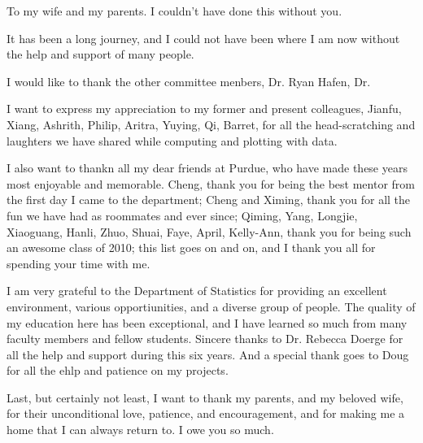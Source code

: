 %
%
%
%
%

\begin{dedication}
  To my wife and my parents. I couldn't have done this without you.
\end{dedication}

\begin{acknowledgments}
  It has been a long journey, and I could not have been where I am now without the help
  and support of many people.

  I would like to thank the other committee menbers, Dr. Ryan Hafen, Dr. 

  I want to express my appreciation to my former and present colleagues, Jianfu, Xiang, 
  Ashrith, Philip, Aritra, Yuying, Qi, Barret, for all the head-scratching and laughters
  we have shared while computing and plotting with data.

  I also want to thankn all my dear friends at Purdue, who have made these years most
  enjoyable and memorable. Cheng, thank you for being the best mentor from the first 
  day I came to the department; Cheng and Ximing, thank you for all the fun 
  we have had as roommates and ever since; Qiming, Yang, Longjie, Xiaoguang, Hanli, 
  Zhuo, Shuai, Faye, April, Kelly-Ann, thank you for being such an awesome class of 2010;
  this list goes on and on, and I thank you all for spending your time with me.

  I am very grateful to the Department of Statistics for providing an excellent 
  environment, various opportiunities, and a diverse group of people. The quality of
  my education here has been exceptional, and I have learned so much from many 
  faculty members and fellow students. Sincere thanks to Dr. Rebecca Doerge for all
  the help and support during this six years. And a special thank goes to Doug for all
  the ehlp and patience on my projects.

  Last, but certainly not least, I want to thank my parents, and my beloved wife, for
  their unconditional love, patience, and encouragement, and for making me a home 
  that I can always return to. I owe you so much.
\end{acknowledgments}

